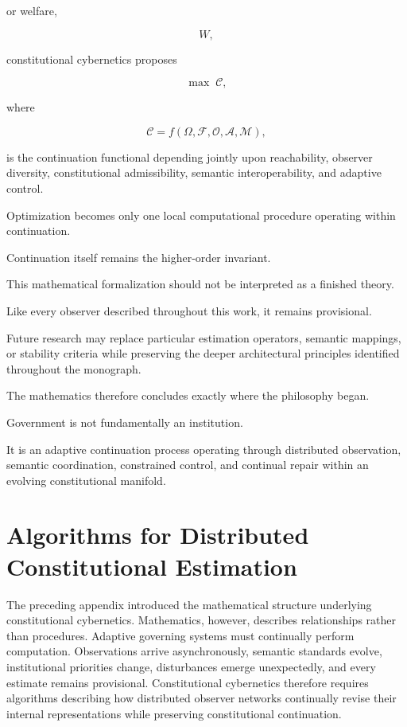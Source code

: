 \documentclass[12pt,a4paper]{article}
\begin{document}
or welfare,

\[
W,
\]

constitutional cybernetics proposes

\[
\max
\;
\mathcal{C},
\]

where

\[
\mathcal{C}
=
f
\left(
\Omega,
\mathcal{F},
\mathcal{O},
\mathcal{A},
\mathcal{M}
\right),
\]

is the continuation functional depending jointly upon reachability, observer diversity, constitutional admissibility, semantic interoperability, and adaptive control.

Optimization becomes only one local computational procedure operating within continuation.

Continuation itself remains the higher-order invariant.

This mathematical formalization should not be interpreted as a finished theory.

Like every observer described throughout this work, it remains provisional.

Future research may replace particular estimation operators, semantic mappings, or stability criteria while preserving the deeper architectural principles identified throughout the monograph.

The mathematics therefore concludes exactly where the philosophy began.

Government is not fundamentally an institution.

It is an adaptive continuation process operating through distributed observation, semantic coordination, constrained control, and continual repair within an evolving constitutional manifold.

\section{Algorithms for Distributed Constitutional Estimation}

The preceding appendix introduced the mathematical structure underlying constitutional cybernetics. Mathematics, however, describes relationships rather than procedures. Adaptive governing systems must continually perform computation. Observations arrive asynchronously, semantic standards evolve, institutional priorities change, disturbances emerge unexpectedly, and every estimate remains provisional. Constitutional cybernetics therefore requires algorithms describing how distributed observer networks continually revise their internal representations while preserving constitutional continuation.
\end{document}
